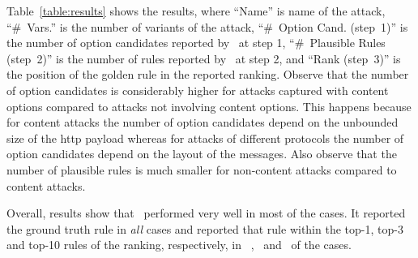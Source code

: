 \documentclass[conference]{IEEEtran}
\begin{document}


Table~\ref{table:results} shows the results, where ``Name'' is 
name of the attack, ``\#~Vars.'' is the number of variants
of the attack, ``\#~Option Cand. (step~1)'' is the number of
option candidates reported by \tname\ at step 1, ``\#~Plausible
Rules (step~2)'' is the number of rules reported by \tname\ at step
2, and  ``Rank (step~3)'' is the position of the golden rule
in the reported ranking. Observe that the number of option candidates
is considerably higher for attacks captured with content options
compared to attacks not involving content options. This happens
because for content attacks the number of option candidates depend on
the unbounded size of the http payload whereas for attacks of
different protocols the number of option candidates depend on the
layout of the messages. Also observe that the number of plausible
rules is much smaller for non-content attacks compared to content
attacks.


Overall, results show that \tname\ performed very well in most of the
cases. It reported the ground truth rule in \emph{all} cases and
reported that rule within the top-1, top-3 and top-10 rules of
the ranking, respectively, in \percTopOneRanking\ ,
\percTopThreeRanking\ and \percTopTenRanking\ of
the cases.



\end{document}
